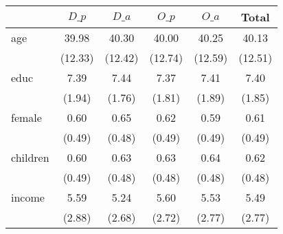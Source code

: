 \begin{tabular}{l*{5}{c}}
\toprule
          &    $D\_p$&    $D\_a$&    $O\_p$&    $O\_a$&    Total\\
\midrule
age       &    39.98&    40.30&    40.00&    40.25&    40.13\\
          &  (12.33)&  (12.42)&  (12.74)&  (12.59)&  (12.51)\\
\addlinespace
educ      &     7.39&     7.44&     7.37&     7.41&     7.40\\
          &   (1.94)&   (1.76)&   (1.81)&   (1.89)&   (1.85)\\
\addlinespace
female    &     0.60&     0.65&     0.62&     0.59&     0.61\\
          &   (0.49)&   (0.48)&   (0.49)&   (0.49)&   (0.49)\\
\addlinespace
children  &     0.60&     0.63&     0.63&     0.64&     0.62\\
          &   (0.49)&   (0.48)&   (0.48)&   (0.48)&   (0.48)\\
\addlinespace
income    &     5.59&     5.24&     5.60&     5.53&     5.49\\
          &   (2.88)&   (2.68)&   (2.72)&   (2.77)&   (2.77)\\
\bottomrule
\end{tabular}

